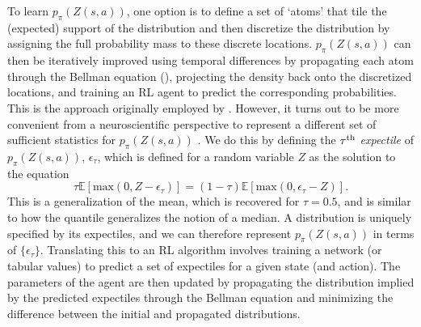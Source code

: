 To learn $p_\pi(Z(s, a))$, one option is to define a set of `atoms' that tile the (expected) support of the distribution and then discretize the distribution by assigning the full probability mass to these discrete locations.
$p_\pi(Z(s, a))$ can then be iteratively improved using temporal differences by propagating each atom through the Bellman equation (), projecting the density back onto the discretized locations, and training an RL agent to predict the corresponding probabilities.
This is the approach originally employed by \citet{bellemare2017distributional}.
However, it turns out to be more convenient from a neuroscientific perspective to represent a different set of sufficient statistics for $p_\pi(Z(s, a))$ \citep{dabney2020distributional,lowet2020distributional}.
We do this by defining the $\tau\textsuperscript{th}$ \emph{expectile} of $p_\pi(Z(s, a))$, $\epsilon_\tau$, which is defined for a random variable $Z$ as the solution to the equation
\begin{equation}
    \tau \mathbb{E} [\text{max}(0, Z - \epsilon_\tau)] = (1-\tau) \mathbb{E} [\text{max}(0, \epsilon_\tau - Z)].
\end{equation}
This is a generalization of the mean, which is recovered for $\tau = 0.5$, and is similar to how the quantile generalizes the notion of a median.
A distribution is uniquely specified by its expectiles, and we can therefore represent $p_\pi(Z(s, a))$ in terms of $\{\epsilon_\tau\}$.
Translating this to an RL algorithm involves training a network (or tabular values) to predict a set of expectiles for a given state (and action).
The parameters of the agent are then updated by propagating the distribution implied by the predicted expectiles through the Bellman equation and minimizing the difference between the initial and propagated distributions.

